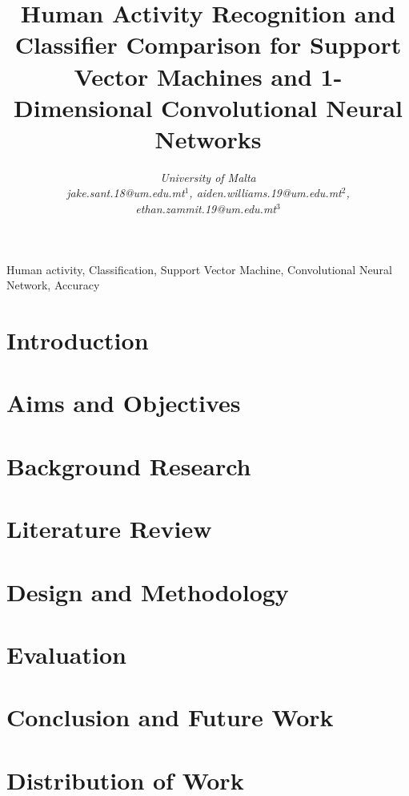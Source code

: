 \documentclass[conference]{IEEEtran}
\begin{document}
\title{Human Activity Recognition and Classifier Comparison for Support Vector Machines and 1-Dimensional Convolutional Neural Networks}

\author{
\textit{University of Malta}\\
\textit{jake.sant.18@um.edu.mt$^{1}$, aiden.williams.19@um.edu.mt$^{2}$, ethan.zammit.19@um.edu.mt$^{3}$}}

  \maketitle

  \begin{IEEEkeywords}
    Human activity, Classification, Support Vector Machine, Convolutional Neural Network, Accuracy

  \end{IEEEkeywords}

  \section{Introduction}
    

  \section{Aims and Objectives}
       

  \section{Background Research}
    

  \section{Literature Review}
    

  \section{Design and Methodology}
    \label{Design}
    

  \section{Evaluation}
  \label{Evaluation}
    

  \section{Conclusion and Future Work}
  \label{Conclusion}
    

  \section{Distribution of Work}
  \label{Distribution}
    

  
  
\end{document}
